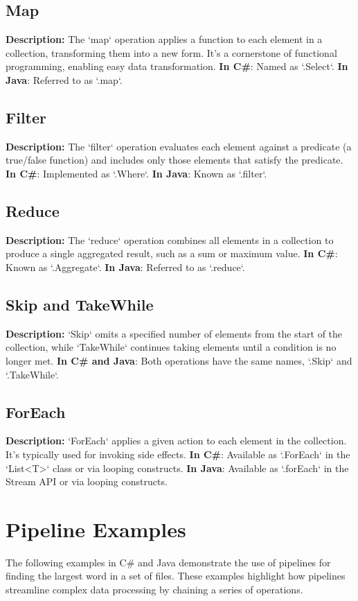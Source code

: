 \subsection{Map}
\textbf{Description:} The `map` operation applies a function to each element in a collection, transforming them into a new form. It's a cornerstone of functional programming, enabling easy data transformation.
\textbf{In C\#}: Named as `.Select`.
\textbf{In Java}: Referred to as `.map`.

\subsection{Filter}
\textbf{Description:} The `filter` operation evaluates each element against a predicate (a true/false function) and includes only those elements that satisfy the predicate.
\textbf{In C\#}: Implemented as `.Where`.
\textbf{In Java}: Known as `.filter`.

\subsection{Reduce}
\textbf{Description:} The `reduce` operation combines all elements in a collection to produce a single aggregated result, such as a sum or maximum value.
\textbf{In C\#}: Known as `.Aggregate`.
\textbf{In Java}: Referred to as `.reduce`.

\subsection{Skip and TakeWhile}
\textbf{Description:} `Skip` omits a specified number of elements from the start of the collection, while `TakeWhile` continues taking elements until a condition is no longer met.
\textbf{In C\# and Java}: Both operations have the same names, `.Skip` and `.TakeWhile`.

\subsection{ForEach}
\textbf{Description:} `ForEach` applies a given action to each element in the collection. It's typically used for invoking side effects.
\textbf{In C\#}: Available as `.ForEach` in the `List<T>` class or via looping constructs.
\textbf{In Java}: Available as `.forEach` in the Stream API or via looping constructs.



\section{Pipeline Examples}
The following examples in C\# and Java demonstrate the use of pipelines for finding the largest word in a set of files. These examples highlight how pipelines streamline complex data processing by chaining a series of operations.

